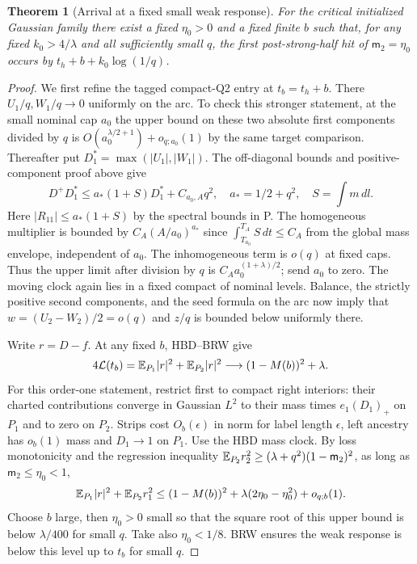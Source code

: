 \documentclass[11pt]{article}
\newtheorem{theorem}{Theorem}\newtheorem{lemma}{Lemma}
\begin{document}
\begin{theorem}[Arrival at a fixed small weak response]\label{an04tbwv1:smallhit}
For the critical initialized Gaussian family there exist a fixed
$\eta_0>0$ and a fixed finite $b$ such that, for any fixed
$k_0>4/\lambda$ and all sufficiently small $q$, the first
post-strong-half hit of $\mathsf m_2=\eta_0$ occurs by
$t_h+b+k_0\log(1/q)$.
\end{theorem}
\begin{proof}
We first refine the tagged compact-Q2 entry at $t_b=t_h+b$.
There $U_1/q,W_1/q\to0$ uniformly on the arc. To check this
stronger statement, at the small nominal cap $a_0$ the upper
bound on these two absolute first components divided by $q$ is
$O(a_0^{\lambda/2+1})+o_{q;a_0}(1)$ by the same target comparison.
Thereafter put $D_1^*=\max(|U_1|,|W_1|)$. The off-diagonal
bounds and positive-component proof above give
\[
 D^+D_1^*\le a_*(1+S)D_1^*+C_{a_0,A}q^2,\quad
 a_*=1/2+q^2,\quad S=\int m\,dl.
\]
Here $|R_{11}|\le a_*(1+S)$ by the spectral bounds in P.
The homogeneous multiplier is bounded by
$C_A(A/a_0)^{a_*}$ since $\int_{T_{a_0}}^{T_A} S\,dt\le C_A$
from the global mass envelope, independent of $a_0$. The
inhomogeneous term is $o(q)$ at fixed caps. Thus the upper limit
after division by $q$ is $C_A a_0^{(1+\lambda)/2}$; send $a_0$
to zero. The moving clock again lies in a fixed compact of nominal
levels. Balance, the strictly positive second components, and the
seed formula on the arc now imply that $w=(U_2-W_2)/2=o(q)$ and
$z/q$ is bounded below uniformly there.

Write $r=D-f$. At any fixed $b$, HBD--BRW give
\[
 4\mathcal L(t_b)=\mathbb E_{P_1}|r|^2+\mathbb E_{P_2}|r|^2
     \longrightarrow (1-M(b))^2+\lambda .
\]
For this order-one statement, restrict first to compact right interiors:
their charted contributions converge in Gaussian $L^2$ to their
mass times $e_1(D_1)_+$ on $P_1$ and to zero on $P_2$.
Strips cost $O_b(\epsilon)$ in norm for label length $\epsilon$,
left ancestry has $o_b(1)$ mass and $D_1\to1$ on $P_1$.
Use the HBD mass clock. By loss monotonicity and the regression
inequality $\mathbb E_{P_2} r_2^2\ge(\lambda+q^2)(1-\mathsf m_2)^2$,
as long as $\mathsf m_2\le\eta_0<1$,
\begin{equation}\label{an04tbwv1:lossbudget}
 \mathbb E_{P_1}|r|^2+\mathbb E_{P_2}r_1^2
 \le (1-M(b))^2+\lambda(2\eta_0-\eta_0^2)+o_{q;b}(1).
\end{equation}
Choose $b$ large, then $\eta_0>0$ small so that the square root
of this upper bound is below $\lambda/400$ for small $q$.
Take also $\eta_0<1/8$. BRW ensures the weak response is below
this level up to $t_b$ for small $q$.


\end{proof}
\end{document}
